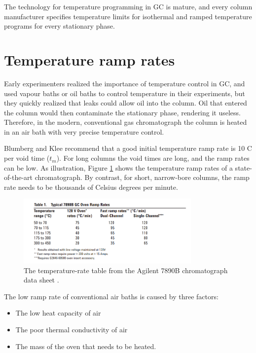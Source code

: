 The technology for temperature programming in GC is mature, and every column
manufacturer specifies temperature limits for isothermal and ramped temperature
programs for every stationary phase.

\section{Temperature ramp rates}
\label{sec:RampRates}
Early experimenters realized the importance of temperature control in GC, and
used vapour baths \autocite{Desty1957} or oil baths \autocite{Eggertsen1956} to
control temperature in their experiments, but they quickly realized that leaks
could allow oil into the column. Oil that entered the column would then
contaminate the stationary phase, rendering it useless. Therefore, in the
modern, conventional gas chromatograph the column is heated in an air bath with
very precise temperature control.

Blumberg and Klee \autocite{Blumberg2000} recommend that a good initial
temperature ramp rate is 10 C\textdegree{} per void time ($t_m$). For long
columns the void times are long, and the ramp rates can be low. As illustration,
Figure \ref{fig:RampRate7890B} shows the temperature ramp rates of a
state-of-the-art chromatograph. By contrast, for short, narrow-bore columns, the
ramp rate needs to be thousands of Celsius degrees per minute.

\begin{figure}
	\centering
	\includegraphics[width=0.8\textwidth]{Figures/7890B.png}
	\decoRule
	\caption[A temperature-rate table from the Agilent7890B data sheet]{The
	temperature-rate table from the Agilent 7890B chromatograph data sheet
	\autocite{7890B}. }
	\label{fig:RampRate7890B}
\end{figure}

The low ramp rate of conventional air baths is caused by three factors:

\begin{itemize}
	\item The low heat capacity of air
	\item The poor thermal conductivity of air
	\item The mass of the oven that needs to be heated. 
\end{itemize}

